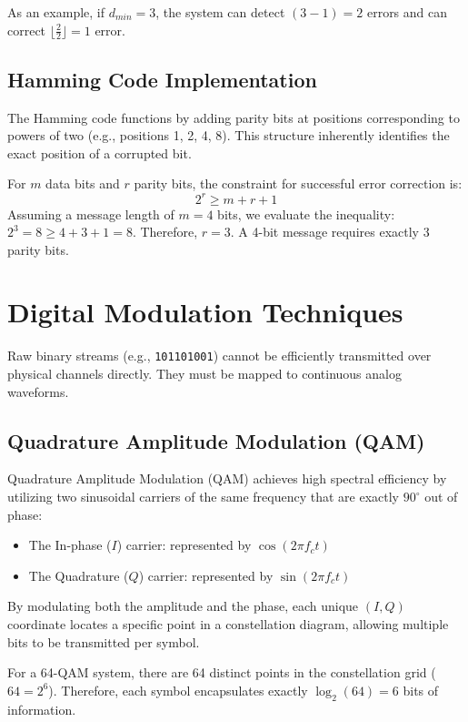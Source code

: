 \documentclass[10pt, conference]{IEEEtran}
\begin{document}
As an example, if $d_{min} = 3$, the system can detect $(3-1) = 2$ errors and can correct $\lfloor \frac{2}{2} \rfloor = 1$ error.

\subsection{\textbf{Hamming Code Implementation}}
The Hamming code functions by adding parity bits at positions corresponding to powers of two (e.g., positions 1, 2, 4, 8). This structure inherently identifies the exact position of a corrupted bit. 

For $m$ data bits and $r$ parity bits, the constraint for successful error correction is:
\begin{equation}
    2^r \geq m + r + 1
\end{equation}
Assuming a message length of $m = 4$ bits, we evaluate the inequality: $2^3 = 8 \geq 4 + 3 + 1 = 8$. Therefore, $r = 3$. A 4-bit message requires exactly 3 parity bits.


\section{\large \textbf{Digital Modulation Techniques}}

Raw binary streams (e.g., \texttt{101101001}) cannot be efficiently transmitted over physical channels directly. They must be mapped to continuous analog waveforms. 

\subsection{\textbf{Quadrature Amplitude Modulation (QAM)}}
Quadrature Amplitude Modulation (QAM) achieves high spectral efficiency by utilizing two sinusoidal carriers of the same frequency that are exactly $90^\circ$ out of phase:
\begin{itemize}
    \item The In-phase ($I$) carrier: represented by $\cos(2\pi f_c t)$
    \item The Quadrature ($Q$) carrier: represented by $\sin(2\pi f_c t)$
\end{itemize}

By modulating both the amplitude and the phase, each unique $(I, Q)$ coordinate locates a specific point in a constellation diagram, allowing multiple bits to be transmitted per symbol.

For a 64-QAM system, there are 64 distinct points in the constellation grid ($64 = 2^6$). Therefore, each symbol encapsulates exactly $\log_2(64) = 6$ bits of information. 
\end{document}

